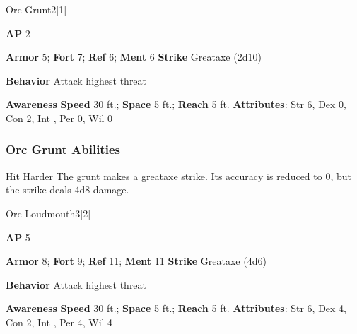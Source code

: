 \begin{monsection}{Orc Grunt}{2}[1]
\vspace{-1em}\vspace{-1em}
\begin{spellcontent}
\begin{spelltargetinginfo}
{\textbf{AP} 2}

\pari \textbf{Armor} 5;
\textbf{Fort} 7;
\textbf{Ref} 6;
\textbf{Ment} 6
\pari \textbf{Strike} Greataxe  (2d10)



\pari \textbf{Behavior} Attack highest threat
\end{spelltargetinginfo}
\end{spellcontent}

\begin{monsterfooter}
\pari \textbf{Awareness} 
\pari \textbf{Speed} 30 ft.;
\textbf{Space} 5 ft.;
\textbf{Reach} 5 ft.
\pari \textbf{Attributes}:
Str 6,
Dex 0,
Con 2,
Int ,
Per 0,
Wil 0
\end{monsterfooter}
\end{monsection}


\subsubsection{Orc Grunt Abilities}

\begin{freeability}{Hit Harder}
The grunt makes a greataxe strike.
Its accuracy is reduced to 0, but the strike deals 4d8 damage.
\end{freeability}

\begin{monsection}{Orc Loudmouth}{3}[2]
\vspace{-1em}\vspace{-1em}
\begin{spellcontent}
\begin{spelltargetinginfo}
{\textbf{AP} 5}

\pari \textbf{Armor} 8;
\textbf{Fort} 9;
\textbf{Ref} 11;
\textbf{Ment} 11
\pari \textbf{Strike} Greataxe  (4d6)



\pari \textbf{Behavior} Attack highest threat
\end{spelltargetinginfo}
\end{spellcontent}

\begin{monsterfooter}
\pari \textbf{Awareness} 
\pari \textbf{Speed} 30 ft.;
\textbf{Space} 5 ft.;
\textbf{Reach} 5 ft.
\pari \textbf{Attributes}:
Str 6,
Dex 4,
Con 2,
Int ,
Per 4,
Wil 4
\end{monsterfooter}
\end{monsection}


